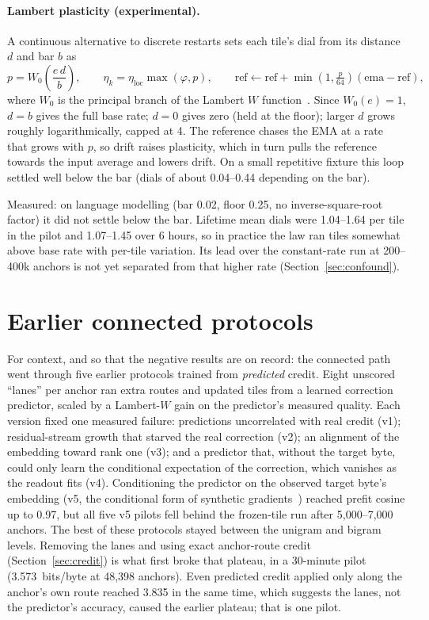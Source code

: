 \documentclass[10pt]{article}
\newcommand{\bpb}{bits/byte}
\begin{document}
\paragraph{Lambert plasticity (experimental).} A continuous alternative to discrete restarts sets each
tile's dial from its distance $d$ and bar $b$ as
\begin{equation}
  p = W_0\!\left(\frac{e\,d}{b}\right), \qquad \eta_k = \eta_{\text{loc}}\max(\varphi, p), \qquad
  \text{ref} \leftarrow \text{ref} + \min\!\left(1, \tfrac{p}{64}\right)(\text{ema}-\text{ref}),
\end{equation}
where $W_0$ is the principal branch of the Lambert $W$ function~\citep{corless1996lambert}. Since
$W_0(e)=1$, $d=b$ gives the full base rate; $d=0$ gives zero (held at the floor); larger $d$ grows
roughly logarithmically, capped at 4. The reference chases the EMA at a rate that grows with $p$, so
drift raises plasticity, which in turn pulls the reference towards the input average and lowers drift.
On a small repetitive fixture this loop settled well below the bar (dials of about 0.04--0.44 depending
on the bar).

Measured: on language modelling (bar 0.02, floor 0.25, no inverse-square-root factor) it did not
settle below the bar. Lifetime mean dials were 1.04--1.64 per tile in the pilot and 1.07--1.45 over 6
hours, so in practice the law ran tiles somewhat above base rate with per-tile variation. Its lead
over the constant-rate run at 200--400k anchors is not yet separated from that higher rate
(Section~\ref{sec:confound}).

\section{Earlier connected protocols}
\label{sec:history}

For context, and so that the negative results are on record: the connected path went through five
earlier protocols trained from \emph{predicted} credit. Eight unscored ``lanes'' per anchor ran extra
routes and updated tiles from a learned correction predictor, scaled by a Lambert-$W$ gain on the
predictor's measured quality. Each version fixed one measured failure: predictions uncorrelated with real
credit (v1); residual-stream growth that starved the real correction (v2); an alignment of the
embedding toward rank one (v3); and a predictor that, without the target byte, could only learn the
conditional expectation of the correction, which vanishes as the readout fits (v4). Conditioning the
predictor on the observed target byte's embedding (v5, the conditional form of synthetic
gradients~\citep{jaderberg2017dni}) reached prefit cosine up to 0.97, but all five v5 pilots fell
behind the frozen-tile run after 5,000--7,000 anchors. The best of these protocols stayed between the
unigram and bigram levels. Removing the lanes and using exact anchor-route credit (Section~\ref{sec:credit})
is what first broke that plateau, in a 30-minute pilot (3.573~\bpb{} at 48,398 anchors). Even predicted
credit applied only along the anchor's own route reached 3.835 in the same time, which suggests the lanes,
not the predictor's accuracy, caused the earlier plateau; that is one pilot.
\end{document}
